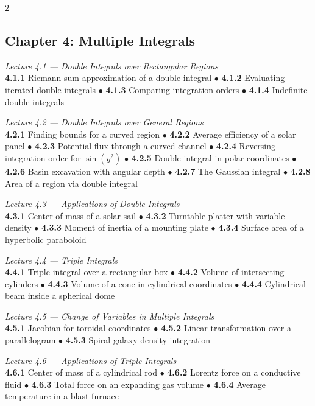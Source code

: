 \begin{multicols}{2}
\subsection*{Chapter 4: Multiple Integrals}

\noindent\textit{Lecture 4.1 --- Double Integrals over Rectangular Regions}\\
\textbf{4.1.1} Riemann sum approximation of a double integral \(\bullet\)
\textbf{4.1.2} Evaluating iterated double integrals \(\bullet\)
\textbf{4.1.3} Comparing integration orders \(\bullet\)
\textbf{4.1.4} Indefinite double integrals

\medskip
\noindent\textit{Lecture 4.2 --- Double Integrals over General Regions}\\
\textbf{4.2.1} Finding bounds for a curved region \(\bullet\)
\textbf{4.2.2} Average efficiency of a solar panel \(\bullet\)
\textbf{4.2.3} Potential flux through a curved channel \(\bullet\)
\textbf{4.2.4} Reversing integration order for $\sin(y^2)$ \(\bullet\)
\textbf{4.2.5} Double integral in polar coordinates \(\bullet\)
\textbf{4.2.6} Basin excavation with angular depth \(\bullet\)
\textbf{4.2.7} The Gaussian integral \(\bullet\)
\textbf{4.2.8} Area of a region via double integral

\medskip
\noindent\textit{Lecture 4.3 --- Applications of Double Integrals}\\
\textbf{4.3.1} Center of mass of a solar sail \(\bullet\)
\textbf{4.3.2} Turntable platter with variable density \(\bullet\)
\textbf{4.3.3} Moment of inertia of a mounting plate \(\bullet\)
\textbf{4.3.4} Surface area of a hyperbolic paraboloid

\medskip
\noindent\textit{Lecture 4.4 --- Triple Integrals}\\
\textbf{4.4.1} Triple integral over a rectangular box \(\bullet\)
\textbf{4.4.2} Volume of intersecting cylinders \(\bullet\)
\textbf{4.4.3} Volume of a cone in cylindrical coordinates \(\bullet\)
\textbf{4.4.4} Cylindrical beam inside a spherical dome

\medskip
\noindent\textit{Lecture 4.5 --- Change of Variables in Multiple Integrals}\\
\textbf{4.5.1} Jacobian for toroidal coordinates \(\bullet\)
\textbf{4.5.2} Linear transformation over a parallelogram \(\bullet\)
\textbf{4.5.3} Spiral galaxy density integration

\medskip
\noindent\textit{Lecture 4.6 --- Applications of Triple Integrals}\\
\textbf{4.6.1} Center of mass of a cylindrical rod \(\bullet\)
\textbf{4.6.2} Lorentz force on a conductive fluid \(\bullet\)
\textbf{4.6.3} Total force on an expanding gas volume \(\bullet\)
\textbf{4.6.4} Average temperature in a blast furnace


\end{multicols}
